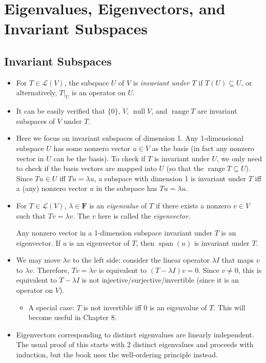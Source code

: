 \documentclass[11pt]{article}
\newcommand{\df}[1]{\textit{\textsf{#1}}}
\newcommand{\F}{\mathbf{F}}
\newcommand{\s}{\operatorname{span}}
\newcommand{\n}{\operatorname{null}}
\renewcommand{\r}{\operatorname{range}}
\newcommand{\LV}{\mathcal{L}(V)}
\begin{document}
\newpage
\section{Eigenvalues, Eigenvectors, and Invariant Subspaces}
\subsection{Invariant Subspaces}
\begin{itemize}
    \item For $T \in \LV$, the subspace $U$ of $V$ is \df{invariant under $T$} if $T(U) \subseteq U$, or alternatively, $T|_U$ is an operator on $U$.
    \item It can be easily verified that $\{0\}$, $V$, $\n V$, and $\r T$ are invariant subspaces of $V$ under $T$.
    \item Here we focus on invariant subspaces of dimension 1. Any 1-dimensional subspace $U$ has some nonzero vector $u \in V$ as the basis (in fact any nonzero vector in $U$ can be the basis). To check if $T$ is invariant under $U$, we only need to check if the basis vectors are mapped into $U$ (so that the $\r T \subseteq U$). Since $Tu \in U$ iff $Tu = \lambda u$, a subspace with dimension 1 is invariant under $T$ iff a (any) nonzero vector $u$ in the subspace has $Tu = \lambda u$.
    \item For $T \in \LV$, $\lambda \in \F$ is an \df{eigenvalue} of $T$ if there exists a nonzero $v \in V$ such that $Tv = \lambda v$. The $v$ here is called the \df{eigenvector}.
    
    Any nonzero vector in a 1-dimension subspace invariant under $T$ is an eigenvector. If $u$ is an eigenvector of $T$, then $\s(u)$ is invariant under $T$.
    \item We may move $\lambda v$ to the left side: consider the linear operator $\lambda I$ that maps $v$ to $\lambda v$. Therefore, $Tv = \lambda v$ is equivalent to $(T-\lambda I) v = 0$. Since $v \not= 0$, this is equivalent to $T-\lambda I$ is not injective/surjective/invertible (since it is an operator on $V$).
    \begin{itemize}
        \item A special case: $T$ is not invertible iff 0 is an eigenvalue of $T$. This will become useful in Chapter 8.
    \end{itemize}
    \item Eigenvectors corresponding to distinct eigenvalues are linearly independent. The usual proof of this starts with 2 distinct eigenvalues and proceeds with induction, but the book uses the well-ordering principle instead.
    

\end{itemize}
\end{document}
